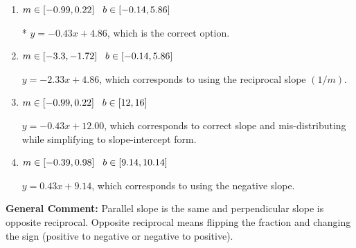 \documentclass{extbook}[14pt]
\begin{document}
\begin{enumerate}
{\begin{enumerate}[label=\Alph*.]
 $y = -0.43x - 4.86$, which corresponds to using the correct slope and getting the negative $y$-intercept.
\item \( m \in [-0.99, 0.22] \hspace*{3mm} b \in [-0.14, 5.86] \)

* $y = -0.43x + 4.86$, which is the correct option.
\item \( m \in [-3.3, -1.72] \hspace*{3mm} b \in [-0.14, 5.86] \)

 $y = -2.33x + 4.86$, which corresponds to using the reciprocal slope $(1/m)$.
\item \( m \in [-0.99, 0.22] \hspace*{3mm} b \in [12, 16] \)

 $y = -0.43x + 12.00$, which corresponds to correct slope and mis-distributing while simplifying to slope-intercept form.
\item \( m \in [-0.39, 0.98] \hspace*{3mm} b \in [9.14, 10.14] \)

 $y = 0.43x + 9.14$, which corresponds to using the negative slope.
\end{enumerate}

\textbf{General Comment:} Parallel slope is the same and perpendicular slope is opposite reciprocal. Opposite reciprocal means flipping the fraction and changing the sign (positive to negative or negative to positive).
}
\end{enumerate}
\end{document}
